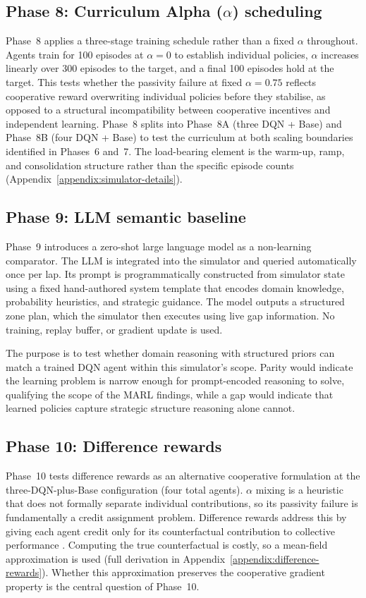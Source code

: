 \subsection{Phase 8: Curriculum Alpha ($\alpha$) scheduling}
\label{sec:curriculum}

Phase~8 applies a three-stage training schedule rather than a fixed $\alpha$ throughout. Agents train for 100 episodes at $\alpha = 0$ to establish individual policies, $\alpha$ increases linearly over 300 episodes to the target, and a final 100 episodes hold at the target. This tests whether the passivity failure at fixed $\alpha = 0.75$ reflects cooperative reward overwriting individual policies before they stabilise, as opposed to a structural incompatibility between cooperative incentives and independent learning. Phase~8 splits into Phase~8A (three DQN + Base) and Phase~8B (four DQN + Base) to test the curriculum at both scaling boundaries identified in Phases~6 and~7. The load-bearing element is the warm-up, ramp, and consolidation structure rather than the specific episode counts (Appendix~\ref{appendix:simulator-details}).

\subsection{Phase 9: LLM semantic baseline}
\label{sec:llm-baseline}

Phase~9 introduces a zero-shot large language model as a non-learning comparator. The LLM is integrated into the simulator and queried automatically once per lap. Its prompt is programmatically constructed from simulator state using a fixed hand-authored system template that encodes domain knowledge, probability heuristics, and strategic guidance. The model outputs a structured zone plan, which the simulator then executes using live gap information. No training, replay buffer, or gradient update is used.

The purpose is to test whether domain reasoning with structured priors can match a trained DQN agent within this simulator's scope. Parity would indicate the learning problem is narrow enough for prompt-encoded reasoning to solve, qualifying the scope of the MARL findings, while a gap would indicate that learned policies capture strategic structure reasoning alone cannot.

\subsection{Phase 10: Difference rewards}
\label{sec:difference-rewards}
Phase~10 tests difference rewards as an alternative cooperative formulation at the three-DQN-plus-Base configuration (four total agents). $\alpha$ mixing is a heuristic that does not formally separate individual contributions, so its passivity failure is fundamentally a credit assignment problem. Difference rewards address this by giving each agent credit only for its counterfactual contribution to collective performance \citep{wolpert2001optimal}. Computing the true counterfactual is costly, so a mean-field approximation is used (full derivation in Appendix~\ref{appendix:difference-rewards}). Whether this approximation preserves the cooperative gradient property is the central question of Phase~10.

